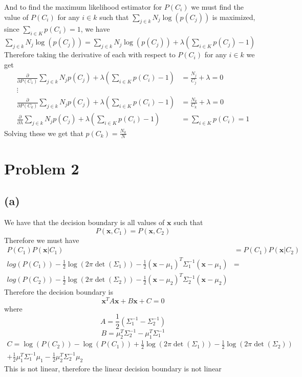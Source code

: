 \documentclass[12pt]{article}
\begin{document}
And to find the maximum likelihood estimator for $P(C_i)$ we must find the value of $P(C_i)$ for any $i\in k$ such that 
$\sum_{j \in k} N_j\log(p(C_j))$ is maximized, since $\sum_{i\in K}p(C_i)=1$, we have $\sum_{j \in k} N_j\log(p(C_j))=\sum_{j \in k} N_j\log(p(C_j))+\lambda(\sum_{i\in K}p(C_j)-1)$
Therefore taking the derivative of each with respect to $P(C_i)$ for any $i\in k$ we get
\begin{align*}
    \frac{\partial }{\partial P(C_1)}\sum_{j \in k} N_jp(C_j)+\lambda(\sum_{i\in K}p(C_i)-1)&=\frac{N_j}{C_j}+\lambda=0\\
    \vdots \\
    \frac{\partial }{\partial P(C_k)}\sum_{j \in k} N_jp(C_j)+\lambda(\sum_{i\in K}p(C_i)-1)&=\frac{N_k}{C_k}+\lambda=0\\
    \frac{\partial }{\partial \lambda}\sum_{j \in k} N_jp(C_j)+\lambda(\sum_{i\in K}p(C_i)-1)&=\sum_{i\in K}p(C_i)=1
\end{align*}
Solving these we get that $p(C_k)=\boxed{\frac{N_k}{N}}$
\section*{Problem 2}
\subsection*{(a)}
We have that the decision boundary is all values of $\textbf{x}$ such that 
$$P(\textbf{x},C_1)=P(\textbf{x},C_2)$$
Therefore we must have 
\begin{align*}
    P(C_1)P(\textbf{x}|C_1)&=P(C_1)P(\textbf{x}|C_2)\\
    log(P(C_1))-\frac{1}{2}\log(2\pi\det(\Sigma_1))-\frac{1}{2}(\textbf{x}-\mu_1)^T\Sigma_1^{-1}(\textbf{x}-\mu_1)&=\\
    log(P(C_2))-\frac{1}{2}\log(2\pi\det(\Sigma_2))-\frac{1}{2}(\textbf{x}-\mu_2)^T\Sigma_2^{-1}(\textbf{x}-\mu_2)
\end{align*}
Therefore the decision boundary is
$$\boxed{\textbf{x}^TA\textbf{x}+B\textbf{x}+C=0}$$
where
$$A=\frac{1}{2}(\Sigma_1^{-1}-\Sigma_2^{-1})$$
$$B=\mu_2^T\Sigma_2^{-1}-\mu_1^T\Sigma_1^{-1}$$
\begin{multline*}
    C=\log(P(C_2))-\log(P(C_1))+\frac{1}{2}\log(2\pi\det(\Sigma_1))-\frac{1}{2}\log(2\pi\det(\Sigma_2))\\
+\frac{1}{2}\mu_1^T\Sigma_1^{-1}\mu_1-\frac{1}{2}\mu_2^T\Sigma_2^{-1}\mu_2
\end{multline*}
This is not linear, therefore the linear decision boundary is not linear
\end{document}
